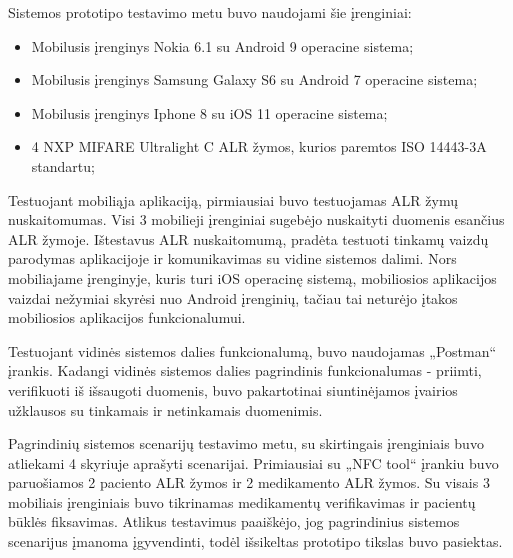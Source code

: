 Sistemos prototipo testavimo metu buvo naudojami šie įrenginiai:
\begin{itemize}
    \item Mobilusis įrenginys Nokia 6.1 su Android 9 operacine sistema;
    \item Mobilusis įrenginys Samsung Galaxy S6 su Android 7 operacine sistema;
    \item Mobilusis įrenginys Iphone 8 su iOS 11 operacine sistema;
    \item 4 NXP MIFARE Ultralight C ALR žymos, kurios paremtos ISO 14443-3A standartu;
\end{itemize}

Testuojant mobiliąja aplikaciją, pirmiausiai buvo testuojamas ALR žymų nuskaitomumas. Visi 3 mobilieji įrenginiai sugebėjo nuskaityti duomenis esančius ALR žymoje. Ištestavus ALR nuskaitomumą, pradėta testuoti tinkamų vaizdų parodymas aplikacijoje ir komunikavimas su vidine sistemos dalimi. Nors mobiliajame įrenginyje, kuris turi iOS operacinę sistemą, mobiliosios aplikacijos vaizdai nežymiai skyrėsi nuo Android įrenginių, tačiau tai neturėjo įtakos mobiliosios aplikacijos funkcionalumui.

Testuojant vidinės sistemos dalies funkcionalumą, buvo naudojamas „Postman“ įrankis. Kadangi vidinės sistemos dalies pagrindinis funkcionalumas - priimti, verifikuoti iš išsaugoti duomenis, buvo pakartotinai siuntinėjamos įvairios užklausos su tinkamais ir netinkamais duomenimis.

Pagrindinių sistemos scenarijų testavimo metu, su skirtingais įrenginiais buvo atliekami 4 skyriuje aprašyti scenarijai. Primiausiai su „NFC tool“ įrankiu buvo paruošiamos 2 paciento ALR žymos ir 2 medikamento ALR žymos. Su visais 3 mobiliais įrenginiais buvo tikrinamas medikamentų verifikavimas ir pacientų būklės fiksavimas. Atlikus testavimus paaiškėjo, jog pagrindinius sistemos scenarijus įmanoma įgyvendinti, todėl išsikeltas prototipo tikslas buvo pasiektas.